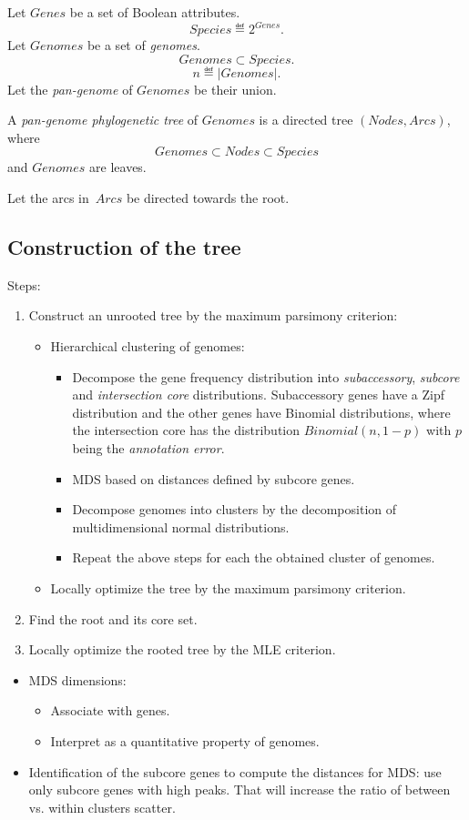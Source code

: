 \documentclass[10pt,a4paper]{article}
\theoremstyle{plain} \newtheorem{Lem}{Lemma}
\begin{document}
Let $Genes$ be a set of Boolean attributes.
$$ Species \eqdef 2^{Genes}. $$
Let $Genomes$ be a set of {\em genomes}.
$$ Genomes \subset Species. $$
$$ n \eqdef |Genomes|. $$
Let the {\em pan-genome} of $Genomes$ be their union.

A {\em pan-genome phylogenetic tree} of $Genomes$ is a directed tree $(Nodes,Arcs)$, where $$Genomes \subset Nodes \subset Species$$ and $Genomes$ are leaves.

Let the arcs in~$Arcs$ be directed towards the root.


\subsection{Construction of the tree}

Steps:
\begin{enumerate}
\item Construct an unrooted tree by the maximum parsimony criterion:
  \begin{itemize}
    \item Hierarchical clustering of genomes:
	  \begin{itemize}
	    \item Decompose the gene frequency distribution into {\em subaccessory}, {\em subcore} and {\em intersection core} distributions.
	          Subaccessory genes have a Zipf distribution and the other genes have Binomial distributions,
	          where the intersection core has the distribution $Binomial(n,1-p)$ with $p$ being the {\em annotation error}.
	    \item MDS based on distances defined by subcore genes.
	    \item Decompose genomes into clusters by the decomposition of multidimensional normal distributions.
	    \item Repeat the above steps for each the obtained cluster of genomes.
	  \end{itemize}
   \item Locally optimize the tree by the maximum parsimony criterion.
   \end{itemize}
\item Find the root and its core set.
\item Locally optimize the rooted tree by the MLE criterion.
\end{enumerate}


\Questions
\begin{itemize}
  \item MDS dimensions:
     \begin{itemize}
        \item Associate with genes.
        \item Interpret as a quantitative property of genomes.
     \end{itemize}
   \item Identification of the subcore genes to compute the distances for MDS: use only subcore genes with high peaks.
         That will increase the ratio of between vs. within clusters scatter.
\end{itemize}
\end{document}
